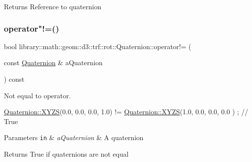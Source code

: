 \begin{DoxyReturn}{Returns}
Reference to quaternion 
\end{DoxyReturn}
\mbox{\label{classlibrary_1_1math_1_1geom_1_1d3_1_1trf_1_1rot_1_1_quaternion_ab4862c47d1ca9beed37023ec2db479f4}} 
\subsubsection{\texorpdfstring{operator"!=()}{operator!=()}}
{\footnotesize\ttfamily bool library\+::math\+::geom\+::d3\+::trf\+::rot\+::\+Quaternion\+::operator!= (\begin{DoxyParamCaption}\item[{const \hyperlink{classlibrary_1_1math_1_1geom_1_1d3_1_1trf_1_1rot_1_1_quaternion}{Quaternion} \&}]{a\+Quaternion }\end{DoxyParamCaption}) const}



Not equal to operator. 


\begin{DoxyCode}
\hyperlink{classlibrary_1_1math_1_1geom_1_1d3_1_1trf_1_1rot_1_1_quaternion_a006294eb483bcfc352c2dc36cf19ceec}{Quaternion::XYZS}(0.0, 0.0, 0.0, 1.0) != \hyperlink{classlibrary_1_1math_1_1geom_1_1d3_1_1trf_1_1rot_1_1_quaternion_a006294eb483bcfc352c2dc36cf19ceec}{Quaternion::XYZS}(1.0, 0.0, 0.0, 0.0
      ) ; \textcolor{comment}{// True}
\end{DoxyCode}



\begin{DoxyParams}[1]{Parameters}
\mbox{\tt in}  & {\em a\+Quaternion} & A quaternion \\
\hline
\end{DoxyParams}
\begin{DoxyReturn}{Returns}
True if quaternions are not equal 
\end{DoxyReturn}
\mbox{\label{classlibrary_1_1math_1_1geom_1_1d3_1_1trf_1_1rot_1_1_quaternion_a7f09ef0c53cb1f2d68a5c0aa8fb9de56}} 
